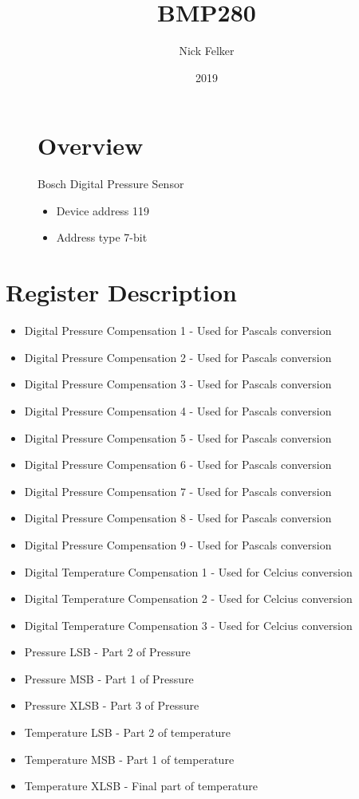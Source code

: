 \documentclass[a4paper,12pt,oneside,pdflatex,italian,final,twocolumn]{article}
\title{ BMP280 }
\author{ Nick Felker }
\date{ 2019 }
\begin{document}
\pagestyle{fancy}



\onecolumn


\begin{figure}
\begin{minipage}{0.47\textwidth}

\section{Overview}
    Bosch Digital Pressure Sensor
    \begin{itemize}
        \item Device address 119
        \item Address type 7-bit
    \end{itemize}


\end{minipage}
\hfill

\end{figure}


\section{Register Description}
\begin{itemize}
\item Digital Pressure Compensation 1 - Used for Pascals conversion
\item Digital Pressure Compensation 2 - Used for Pascals conversion
\item Digital Pressure Compensation 3 - Used for Pascals conversion
\item Digital Pressure Compensation 4 - Used for Pascals conversion
\item Digital Pressure Compensation 5 - Used for Pascals conversion
\item Digital Pressure Compensation 6 - Used for Pascals conversion
\item Digital Pressure Compensation 7 - Used for Pascals conversion
\item Digital Pressure Compensation 8 - Used for Pascals conversion
\item Digital Pressure Compensation 9 - Used for Pascals conversion
\item Digital Temperature Compensation 1 - Used for Celcius conversion
\item Digital Temperature Compensation 2 - Used for Celcius conversion
\item Digital Temperature Compensation 3 - Used for Celcius conversion
\item Pressure LSB - Part 2 of Pressure
\item Pressure MSB - Part 1 of Pressure
\item Pressure XLSB - Part 3 of Pressure
\item Temperature LSB - Part 2 of temperature
\item Temperature MSB - Part 1 of temperature
\item Temperature XLSB - Final part of temperature
\end{itemize}
\end{document}
